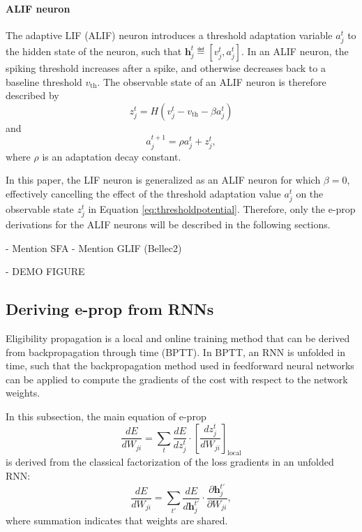         \paragraph{ALIF neuron}
        The adaptive LIF (ALIF) neuron introduces a threshold adaptation variable $a^t_j$ to the hidden state of the neuron, such that $\mathbf{h}^t_j \eqdef \left[v^t_j, a^t_j\right]$.
        In an ALIF neuron, the spiking threshold increases after a spike, and otherwise decreases back to a baseline threshold $v_\text{th}$.
        The observable state of an ALIF neuron is therefore described by
        \begin{equation}\label{eq:alifZ}
        z^t_j = H\left(v_j^t - v_\text{th} - \beta a^t_j\right)
        \end{equation}
        and
        \begin{equation}\label{eq:alifA}
        a^{t+1}_j = \rho a^t_j + z^t_j,
        \end{equation}
        where $\rho$ is an adaptation decay constant.

        In this paper, the LIF neuron is generalized as an ALIF neuron for which $\beta=0$, effectively cancelling the effect of the threshold adaptation value $a^t_j$ on the observable state $z^t_j$ in Equation \ref{eq:thresholdpotential}.
        Therefore, only the e-prop derivations for the ALIF neurons will be described in the following sections.

        \begin{tcolorbox}[colback=orange]
        - Mention SFA
          - Mention GLIF (Bellec2)

        \end{tcolorbox}
        \begin{tcolorbox}[colback=orange]
        - DEMO FIGURE

        \end{tcolorbox}

    \subsection{Deriving e-prop from RNNs}
        Eligibility propagation is a local and online training method that can be derived from backpropagation through time (BPTT).
        In BPTT, an RNN is unfolded in time, such that the backpropagation method used in feedforward neural networks can be applied to compute the gradients of the cost with respect to the network weights.

        In this subsection, the main equation of e-prop
        \begin{equation}
        \frac{dE}{dW_{ji}} =
        \sum_t\frac{dE}{dz_j^t}\cdot\left[\frac{dz_j^t}{dW_{ji}}\right]_\text{local}
        \end{equation}
        is derived from the classical factorization of the loss gradients in an unfolded RNN:
        \begin{equation}\label{eq:clafac}
        \frac{dE}{dW_{ji}} = \sum_{t'}\frac{dE}{d\mathbf{h}_j^{t'}}\cdot\frac{\partial \mathbf{h}_j^{t'}}{\partial W_{ji}},
        \end{equation}
        where summation indicates that weights are shared.

